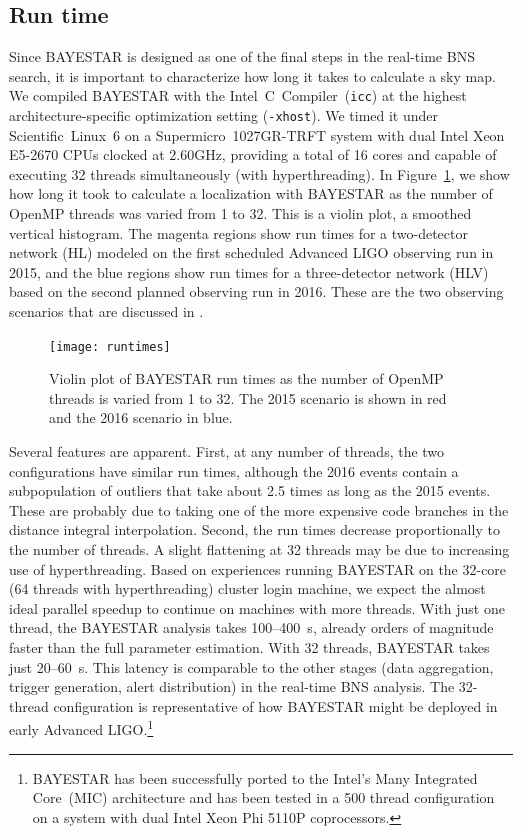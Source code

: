 \documentclass[amsmath,amssymb,aps,prx,reprint,nopreprintnumbers,nofootinbib]{revtex4-1}
\begin{document}
\subsection{Run time}
\label{sec:run-time}

Since \ac{BAYESTAR} is designed as one of the final steps in the real\nobreakdashes-time \ac{BNS} search, it is important to characterize how long it takes to calculate a sky map. We compiled \ac{BAYESTAR} with the Intel~C~Compiler~(\texttt{icc}) at the highest architecture\nobreakdashes-specific optimization setting (\texttt{-xhost}). We timed it under Scientific~Linux~6 on a Supermicro~1027GR\nobreakdashes-TRFT system with dual Intel Xeon E5-2670 CPUs clocked at 2.60GHz, providing a total of 16 cores and capable of executing 32 threads simultaneously (with hyperthreading). In Figure~\ref{fig:runtimes}, we show how long it took to calculate a localization with \ac{BAYESTAR} as the number of OpenMP threads was varied from 1 to 32. This is a violin plot, a smoothed vertical histogram. The magenta regions show run times for a two\nobreakdashes-detector network (HL) modeled on the first scheduled Advanced \ac{LIGO} observing run in 2015, and the blue regions show run times for a three\nobreakdashes-detector network (HLV) based on the second planned observing run in 2016. These are the two observing scenarios that are discussed in \cite{FirstTwoYears}.

\begin{figure}
    \centering
    \texttt{[image: runtimes]}
    \caption[\acs{BAYESTAR} run time]{\label{fig:runtimes}Violin plot of \ac{BAYESTAR} run times as the number of OpenMP threads is varied from 1 to 32. The 2015 scenario is shown in red and the 2016 scenario in blue.}
\end{figure}

Several features are apparent. First, at any number of threads, the two configurations have similar run times, although the 2016 events contain a subpopulation of outliers that take about 2.5 times as long as the 2015 events. These are probably due to taking one of the more expensive code branches in the distance integral interpolation. Second, the run times decrease proportionally to the number of threads. A slight flattening at 32 threads may be due to increasing use of hyperthreading. Based on experiences running \ac{BAYESTAR} on the 32\nobreakdashes-core (64 threads with hyperthreading) cluster login machine, we expect the almost ideal parallel speedup to continue on machines with more threads. With just one thread, the \ac{BAYESTAR} analysis takes 100\nobreakdashes--400~s, already orders of magnitude faster than the full parameter estimation. With 32 threads, \ac{BAYESTAR} takes just 20\nobreakdashes--60~s. This latency is comparable to the other stages (data aggregation, trigger generation, alert distribution) in the real\nobreakdashes-time \ac{BNS} analysis. The 32\nobreakdashes-thread configuration is representative of how \ac{BAYESTAR} might be deployed in early Advanced \ac{LIGO}.\footnote{\ac{BAYESTAR} has been successfully ported to the Intel's Many Integrated Core~(MIC) architecture and has been tested in a 500 thread configuration on a system with dual Intel Xeon Phi 5110P coprocessors.}
\end{document}
